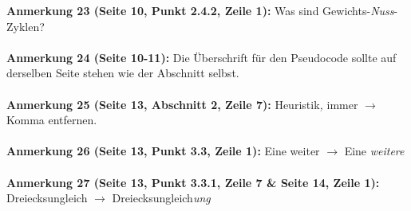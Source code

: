 \documentclass[a4paper,12pt]{book}
\begin{document}
\noindent
\textbf{Anmerkung 23 (Seite 10, Punkt 2.4.2, Zeile 1):}
Was sind Gewichts-\emph{Nuss}-Zyklen? \\
\\

\noindent
\textbf{Anmerkung 24 (Seite 10-11):}
Die Überschrift für den Pseudocode sollte auf derselben Seite stehen wie der Abschnitt selbst. \\
\\

\noindent
\textbf{Anmerkung 25 (Seite 13, Abschnitt 2, Zeile 7):}
Heuristik\emph{,} immer $\rightarrow$ Komma entfernen. \\
\\

\noindent
\textbf{Anmerkung 26 (Seite 13, Punkt 3.3, Zeile 1):}
Eine weiter $\rightarrow$ Eine \emph{weitere} \\
\\

\noindent
\textbf{Anmerkung 27 (Seite 13, Punkt 3.3.1, Zeile 7 \& Seite 14, Zeile 1):}\\
Dreiecksungleich $\rightarrow$ Dreiecksungleich\emph{ung} \\
\\
\end{document}

